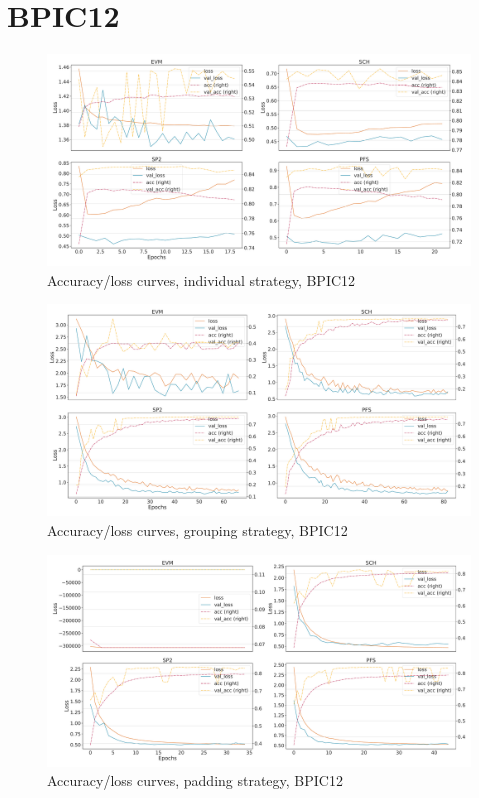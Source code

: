 \section*{BPIC12}
\begin{figure}[!htb]
    \centering
    \includegraphics[width=\textwidth]{gfx/bpic2012/individual_loss_acc_curve.pdf}
    \caption{Accuracy/loss curves, individual strategy, BPIC12}
\end{figure}
\begin{figure}[!htb]
    \centering
    \includegraphics[width=\textwidth]{gfx/bpic2012/grouped_loss_acc_curve.pdf}
    \caption{Accuracy/loss curves, grouping strategy, BPIC12}
\end{figure}
\begin{figure}[!htb]
    \centering
    \includegraphics[width=\textwidth]{gfx/bpic2012/padded_loss_acc_curve.pdf}
    \caption{Accuracy/loss curves, padding strategy, BPIC12}
\end{figure}
